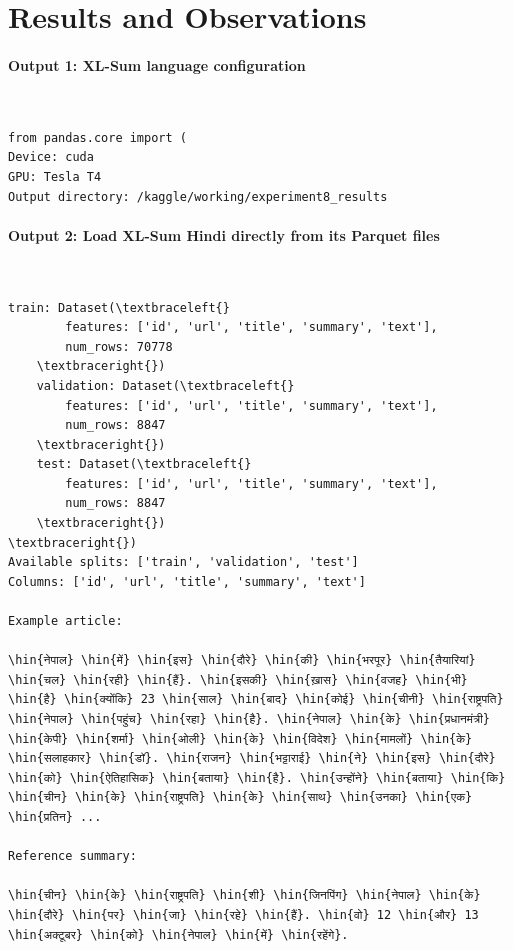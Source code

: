 \documentclass[12pt,a4paper,oneside]{report}
\newcommand{\hin}[1]{{\hinfont #1}}
\begin{document}
\section{Results and Observations}
\paragraph{Output 1: XL-Sum language configuration}\mbox{}\\[-1ex]
\begin{Verbatim}[commandchars=\\\{\},breaklines=true,breakanywhere=true,fontsize=\scriptsize,frame=leftline,framesep=2mm,rulecolor=\color{gray}]
  from pandas.core import (
Device: cuda
GPU: Tesla T4
Output directory: /kaggle/working/experiment8_results
\end{Verbatim}
\paragraph{Output 2: Load XL-Sum Hindi directly from its Parquet files}\mbox{}\\[-1ex]
\begin{Verbatim}[commandchars=\\\{\},breaklines=true,breakanywhere=true,fontsize=\scriptsize,frame=leftline,framesep=2mm,rulecolor=\color{gray}]
    train: Dataset(\textbraceleft{}
        features: ['id', 'url', 'title', 'summary', 'text'],
        num_rows: 70778
    \textbraceright{})
    validation: Dataset(\textbraceleft{}
        features: ['id', 'url', 'title', 'summary', 'text'],
        num_rows: 8847
    \textbraceright{})
    test: Dataset(\textbraceleft{}
        features: ['id', 'url', 'title', 'summary', 'text'],
        num_rows: 8847
    \textbraceright{})
\textbraceright{})
Available splits: ['train', 'validation', 'test']
Columns: ['id', 'url', 'title', 'summary', 'text']

Example article:

\hin{नेपाल} \hin{में} \hin{इस} \hin{दौरे} \hin{की} \hin{भरपूर} \hin{तैयारियां} \hin{चल} \hin{रही} \hin{हैं}. \hin{इसकी} \hin{ख़ास} \hin{वजह} \hin{भी} \hin{है} \hin{क्योंकि} 23 \hin{साल} \hin{बाद} \hin{कोई} \hin{चीनी} \hin{राष्ट्रपति} \hin{नेपाल} \hin{पहुंच} \hin{रहा} \hin{है}. \hin{नेपाल} \hin{के} \hin{प्रधानमंत्री} \hin{केपी} \hin{शर्मा} \hin{ओली} \hin{के} \hin{विदेश} \hin{मामलों} \hin{के} \hin{सलाहकार} \hin{डॉ}. \hin{राजन} \hin{भट्टाराई} \hin{ने} \hin{इस} \hin{दौरे} \hin{को} \hin{ऐतिहासिक} \hin{बताया} \hin{है}. \hin{उन्होंने} \hin{बताया} \hin{कि} \hin{चीन} \hin{के} \hin{राष्ट्रपति} \hin{के} \hin{साथ} \hin{उनका} \hin{एक} \hin{प्रतिन} ...

Reference summary:

\hin{चीन} \hin{के} \hin{राष्ट्रपति} \hin{शी} \hin{जिनपिंग} \hin{नेपाल} \hin{के} \hin{दौरे} \hin{पर} \hin{जा} \hin{रहे} \hin{हैं}. \hin{वो} 12 \hin{और} 13 \hin{अक्टूबर} \hin{को} \hin{नेपाल} \hin{में} \hin{रहेंगे}.
\end{Verbatim}
\end{document}
